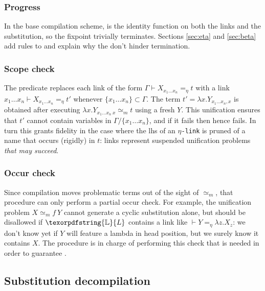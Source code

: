 \documentclass[sigconf,natbib=false,review]{acmart}
\newcommand{\UnifRel}{\ensuremath{\simeq}}
\newcommand{\Ue}{\ensuremath{\UnifRel_m}\xspace}
\newcommand{\linkMacro}[1]{\ensuremath{#1}\texttt{-link}\xspace}
\newcommand{\linketa} {\linkMacro{\eta}}
\newcommand{\linketaM}[3]{\ensuremath{#1 \vdash #2 =_\eta #3}}
\newcommand{\lhs}{lhs\xspace}
\newcommand{\linkStore}{\texorpdfstring{\ensuremath{\mathbb{L}}\xspace}{L}}
\begin{document}


\subsubsection{Progress}
In the base compilation scheme,  is the identity function
on both the links and the substitution, so the fixpoint trivially terminates.
Sections \ref{sec:eta} and \ref{sec:beta} add rules to 
and explain why the don't hinder termination.

\subsubsection{Scope check}\label{sec:sc}
The predicate  
replaces each
link of the form \linketaM{\Gamma}{X_{x_1\ldots x_n}}{t} with
a link
\linketaM{{x_1\ldots x_n}}{X_{x_1\ldots x_n}}{t'} whenever $\{x_1\ldots x_n\} \subset \Gamma$.
The term $t' = \lambda x.Y_{{x_1\ldots x_n},x}$ is obtained after
executing $\lambda x.Y_{{x_1\ldots x_n}~x} \Ue t$ using a fresh $Y$.
This unification
ensures that $t'$ cannot contain variables in $\Gamma / \{x_1\ldots x_n\}$,
and if it fails then \progress hence \hstep fails.
In turn this grants fidelity in the case where the \lhs of an \linketa
is pruned of a name that occurs (rigidly) in $t$:
links represent suspended unification problems
\emph{that may succeed}.

\subsubsection{Occur check}\label{sec:oc}
Since compilation moves problematic terms out of the sight of \Ue{},
that procedure can only perform a partial occur check. For example, the
unification problem $X \Ue f~Y$ cannot generate a cyclic substitution alone,
but should be disallowed if $\linkStore$ contains a link like
$\linketaM{}{Y}{\lambda z.X_z}$: we don't know yet if $Y$ will feature
a lambda in head position, but we surely know it contains $X$.
The procedure  is in charge of
performing this check that is needed in order to
guarantee .


\subsection{Substitution decompilation}\label{sec:decompilation}
\end{document}
